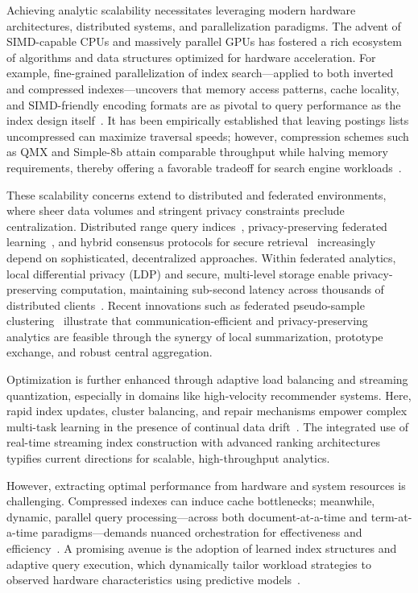Achieving analytic scalability necessitates leveraging modern hardware architectures, distributed systems, and parallelization paradigms. The advent of SIMD-capable CPUs and massively parallel GPUs has fostered a rich ecosystem of algorithms and data structures optimized for hardware acceleration. For example, fine-grained parallelization of index search—applied to both inverted and compressed indexes—uncovers that memory access patterns, cache locality, and SIMD-friendly encoding formats are as pivotal to query performance as the index design itself~\cite{ref16,ref18,ref32,ref49,ref94,ref96}. It has been empirically established that leaving postings lists uncompressed can maximize traversal speeds; however, compression schemes such as QMX and Simple-8b attain comparable throughput while halving memory requirements, thereby offering a favorable tradeoff for search engine workloads~\cite{ref94}.

These scalability concerns extend to distributed and federated environments, where sheer data volumes and stringent privacy constraints preclude centralization. Distributed range query indices~\cite{ref39}, privacy-preserving federated learning~\cite{ref15,ref19}, and hybrid consensus protocols for secure retrieval~\cite{ref17} increasingly depend on sophisticated, decentralized approaches. Within federated analytics, local differential privacy (LDP) and secure, multi-level storage enable privacy-preserving computation, maintaining sub-second latency across thousands of distributed clients~\cite{ref19}. Recent innovations such as federated pseudo-sample clustering~\cite{ref20} illustrate that communication-efficient and privacy-preserving analytics are feasible through the synergy of local summarization, prototype exchange, and robust central aggregation.

Optimization is further enhanced through adaptive load balancing and streaming quantization, especially in domains like high-velocity recommender systems. Here, rapid index updates, cluster balancing, and repair mechanisms empower complex multi-task learning in the presence of continual data drift~\cite{ref75}. The integrated use of real-time streaming index construction with advanced ranking architectures typifies current directions for scalable, high-throughput analytics.

However, extracting optimal performance from hardware and system resources is challenging. Compressed indexes can induce cache bottlenecks; meanwhile, dynamic, parallel query processing—across both document-at-a-time and term-at-a-time paradigms—demands nuanced orchestration for effectiveness and efficiency~\cite{ref32,ref94}. A promising avenue is the adoption of learned index structures and adaptive query execution, which dynamically tailor workload strategies to observed hardware characteristics using predictive models~\cite{ref29,ref70,ref97,ref118}.

